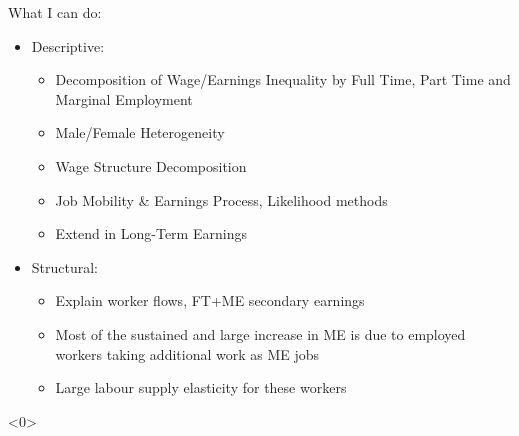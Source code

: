 \documentclass{beamer}
\let\oldcite=\cite
\renewcommand{\cite}[1]{\textcolor[rgb]{.0,.2,.7}{\oldcite{#1}}}
\begin{document}

\begin{frame}{What I can do:}
\begin{itemize}
\setlength{\itemsep}{0.5 cm}
\item Descriptive:
\begin{itemize}
\item Decomposition of Wage/Earnings Inequality by Full Time, Part Time and Marginal Employment
\item Male/Female Heterogeneity
\item Wage Structure Decomposition \cite{CaHeKl13}
\item Job Mobility \& Earnings Process, Likelihood methods
\item Extend \cite{CarriTuRo15} in Long-Term Earnings
\end{itemize}
\item Structural:
\begin{itemize}
\item Explain \cite{CarriTuRo15} worker flows, FT+ME secondary earnings
\item Most of the sustained and large increase in ME is due to employed
workers taking additional work as ME jobs
\item Large labour supply elasticity for these workers
\end{itemize}
\end{itemize}
\end{frame}



%
\begin{frame}<0>
\addtocounter{framenumber}{-1} 
\scriptsize


\end{frame}

%
%
%
%
\end{document}
